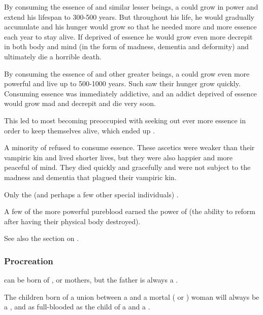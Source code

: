 By consuming the essence of \humans and similar lesser beings, a \resphan could grow in power and extend his lifespan to 300-500 years. 
But throughout his life, he would gradually accumulate  and his hunger would grow so that he needed more and more essence each year to stay alive. 
If deprived of essence he would grow even more decrepit in both body and mind (in the form of madness, dementia and deformity) and ultimately die a horrible death. 

By consuming the essence of \resphain and other greater beings, a \resphan could grow even more powerful and live up to 500-1000 years. Such  saw their hunger grow quickly. 
Consuming \resphan essence was immediately addictive, and an addict deprived of essence would grow mad and decrepit and die very soon. 

This led to most \resphain becoming preoccupied with seeking out ever more essence in order to keep themselves alive, which ended up .

A minority of \resphain refused to consume \human essence.
These ascetics were weaker than their vampiric kin and lived shorter lives, but they were also happier and more peaceful of mind. 
They died quickly and gracefully and were not subject to the madness and dementia that plagued their vampiric kin. 

Only the \satharioth (and perhaps a few other special individuals) . 

A few of the more powerful pureblood \resphain earned the power of  (the ability to reform after having their physical body destroyed). 

See also the section on . 






\subsubsection{Procreation}
\Resphain{} can be born of \resvil{}, \human{} or \nephilic{} mothers, but the father is always a \resphan. 

The children born of a union between a \resphan{} and a mortal (\human{} or \nephil) woman will always be a \resphan, and as full-blooded as the child of a \resphan{} and a \resvil. 

